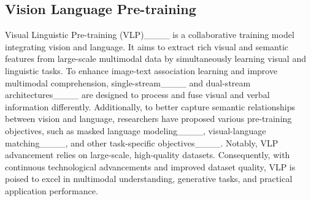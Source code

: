 \subsection{Vision Language Pre-training}
Visual Linguistic Pre-training (VLP)____ is a collaborative training model integrating vision and language. It aims to extract rich visual and semantic features from large-scale multimodal data by simultaneously learning visual and linguistic tasks. To enhance image-text association learning and improve multimodal comprehension, single-stream____ and dual-stream architectures____ are designed to process and fuse visual and verbal information differently. Additionally, to better capture semantic relationships between vision and language, researchers have proposed various pre-training objectives, such as masked language modeling____, visual-language matching____, and other task-specific objectives____. Notably, VLP advancement relies on large-scale, high-quality datasets. Consequently, with continuous technological advancements and improved dataset quality, VLP is poised to excel in multimodal understanding, generative tasks, and practical application performance.